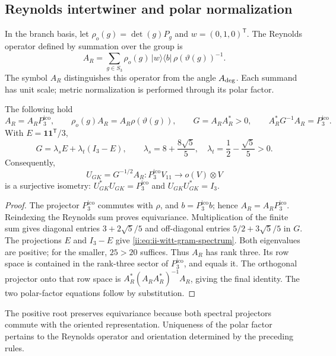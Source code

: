 \subsection{Reynolds intertwiner and polar normalization}

In the branch basis, let \(\rho_o(g)=\det(g)P_g\) and
\(w=(0,1,0)^{\mathsf T}\). The Reynolds operator defined by summation
over the group is
\begin{equation}
 A_R=\sum_{g\in S_3}\rho_o(g)\,|w\rangle\langle b|\,
                       \rho(\vartheta(g))^{-1}.
 \label{ii:eq:ii-witt-reynolds}
\end{equation}
The symbol \(A_R\) distinguishes this operator from the angle
\(A_{\rm deg}\). Each summand has unit scale; metric
normalization is performed through its polar factor.

\begin{proposition}
\label{ii:prop:ii-witt-polar}
The following hold
\[
 A_R=A_RP_3^{\mathrm{ico}},\qquad
 \rho_o(g)A_R=A_R\rho(\vartheta(g)),\qquad
 G=A_RA_R^*>0,\qquad A_R^*G^{-1}A_R=P_3^{\mathrm{ico}}.
\]
With \(E=\mathbf1\mathbf1^{\mathsf T}/3\),
\begin{equation}
 G=\lambda_sE+\lambda_t(I_3-E),\qquad
 \lambda_s=8+\frac{8\sqrt5}{5},\quad
 \lambda_t=\frac12-\frac{\sqrt5}{5}>0.
 \label{ii:eq:ii-witt-gram-spectrum}
\end{equation}
Consequently,
\[
 U_{GK}=G^{-1/2}A_R:P_3^{\mathrm{ico}}V_{11}\longrightarrow o(V)\otimes V
\]
is a surjective isometry:
\(U_{GK}^*U_{GK}=P_3^{\mathrm{ico}}\) and \(U_{GK}U_{GK}^*=I_3\).
\end{proposition}
\begin{proof}
The projector \(P_3^{\mathrm{ico}}\) commutes with \(\rho\), and \(b=P_3^{\mathrm{ico}}b\);
hence \(A_R=A_RP_3^{\mathrm{ico}}\). Reindexing the Reynolds sum proves
equivariance. Multiplication of the finite sum gives diagonal entries
\(3+2\sqrt5/5\) and off-diagonal entries
\(5/2+3\sqrt5/5\) in \(G\). The projections \(E\) and \(I_3-E\)
give \eqref{ii:eq:ii-witt-gram-spectrum}. Both eigenvalues are
positive; for the smaller, \(25>20\) suffices. Thus \(A_R\) has
rank three. Its row space is contained in the rank-three sector
of \(P_3^{\mathrm{ico}}\), and equals it. The orthogonal projector onto that row
space is \(A_R^*(A_RA_R^*)^{-1}A_R\), giving the final identity.
The two polar-factor equations follow by substitution.
\end{proof}

The positive root preserves equivariance because both spectral
projectors commute with the oriented representation. Uniqueness of the
polar factor pertains to the Reynolds operator and orientation
determined by the preceding rules.

